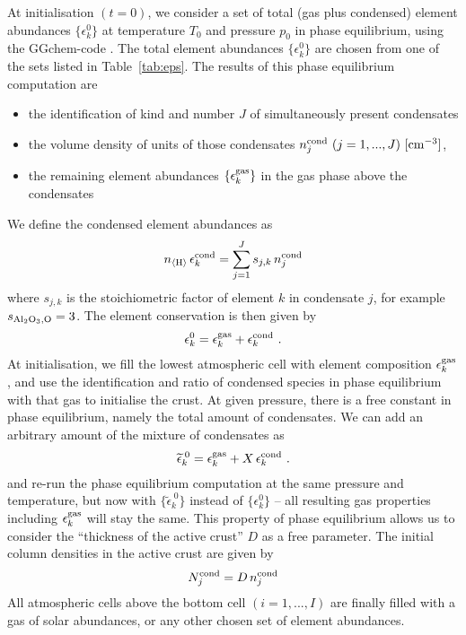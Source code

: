 \documentclass[11pt]{article}
\def\nH{n_{\langle\rm H\rangle}}
\begin{document}
At initialisation $(t=0)$, we consider a set of total (gas plus
condensed) element abundances $\{\epsilon_k^0\}$ at temperature
$T_0$ and pressure $p_0$ in phase equilibrium, using the {\sc
  GGchem}-code \citep{Woitke2017}.  The total element abundances
$\{\epsilon_k^0\}$ are chosen from one of the sets listed in
Table~\ref{tab:eps}. The results of this phase equilibrium 
computation are
\begin{itemize}
\itemsep=-1pt
\parsep=0pt
  \item the identification of kind and number $J$ of simultaneously present 
        condensates
  \item the volume density of units of those condensates
        $n_j^{\rm cond}\ (j=1,...,J)\ \rm[cm^{-3}]$,
  \item the remaining element abundances $\{\epsilon_k^{\rm gas}\}$ in the gas
        phase above the condensates
\end{itemize}
We define the condensed element abundances as
\begin{equation}
  \nH\,\epsilon_k^{\rm cond} = \sum_{j=1}^J s_{j,k}\,n_j^{\rm cond}
\end{equation}
where $s_{j,k}$ is the stoichiometric factor of element $k$ in
condensate $j$, for example $s_{\rm Al_2O_3,O}=3$. The element
conservation is then given by
\begin{equation}
  \epsilon_k^0 = \epsilon_k^{\rm gas} + \epsilon_k^{\rm cond} \ .
\end{equation}
At initialisation, we fill the lowest atmospheric cell with element
composition $\epsilon_k^{\rm gas}$, and use the identification and
ratio of condensed species in phase equilibrium with that gas to
initialise the crust. At given pressure, there is a free constant in
phase equilibrium, namely the total amount of condensates. We can add
an arbitrary amount of the mixture of condensates as
\begin{equation}
  \widetilde{\epsilon}_k^{\;0} = \epsilon_k^{\rm gas} 
                           + X\,\epsilon_k^{\rm cond} \ .
\end{equation}
and re-run the phase equilibrium computation at the same pressure
and temperature, but now with $\{\widetilde\epsilon_k^{\;0}\}$ instead of
$\{\epsilon_k^0\}$ -- all resulting gas properties including $\epsilon_k^{\rm
  gas}$ will stay the same.  This property of phase equilibrium allows us
to consider the ``thickness of the active crust'' $D$ as a free 
parameter. The initial column densities in the active crust are
given by
\begin{equation}
  N_j^{\rm cond} = D\,n_j^{\rm cond}
\end{equation}
All atmospheric cells above the bottom cell $(i=1,...,I)$ are finally
filled with a gas of solar abundances, or any other chosen set 
of element abundances.
\end{document}

